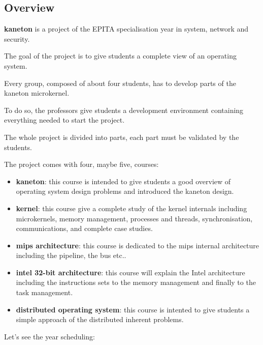\begin{multicols}{2}



\section{Overview}

\textbf{kaneton} is a project of the EPITA specialisation year in system,
network and security.

The goal of the project is to give students a complete view of an operating
system.

Every group, composed of about four students, has to develop parts
of the kaneton microkernel.

To do so, the professors give students a development environment containing
everything needed to start the project.

The whole project is divided into parts, each part must be validated by
the students.

The project comes with four, maybe five, courses:

\begin{itemize}
  \item
    \textbf{kaneton}: this course is intended to give students a good overview
    of operating system design problems and introduced the kaneton design.
  \item
    \textbf{kernel}: this course give a complete study of the kernel
    internals including microkernels, memory management, processes and threads,
    synchronisation, communications, and complete case studies.
  \item
    \textbf{mips architecture}: this course is dedicated to the mips internal
    architecture including the pipeline, the bus etc..
  \item
    \textbf{intel 32-bit architecture}: this course will explain the Intel
    architecture including the instructions sets to the memory management
    and finally to the task management.
  \item
    \textbf{distributed operating system}: this course is intented to
    give students a simple approach of the distributed inherent problems.
\end{itemize}

Let's see the year scheduling:


\end{multicols}
